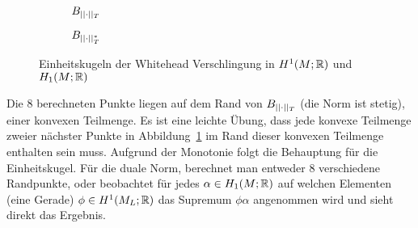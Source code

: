         \begin{figure}[H]
        \centering
        \begin{subfigure}[l]{0.4\textwidth}
                \caption{$B_{||\cdot||_T}$}\label{fig:whiteheadthur}
        
        
        \end{subfigure}    
        \hfill
    \begin{subfigure}[r]{0.4\textwidth}
    \caption{$B_{||\cdot||_T^*}$}

    \end{subfigure}
    \caption{Einheitskugeln der Whitehead Verschlingung in $H^1(M;\mathbb{R})$ und $H_1(M;\mathbb{R})$}
    \end{figure}
    Die $8$ berechneten Punkte liegen auf dem Rand von $B_{||\cdot||_T}$ (die Norm ist stetig), einer konvexen Teilmenge. Es ist eine leichte Übung, dass jede konvexe Teilmenge zweier nächster Punkte in Abbildung~\ref{fig:whiteheadthur} im Rand dieser konvexen Teilmenge enthalten sein muss. Aufgrund der Monotonie folgt die Behauptung für die Einheitskugel. Für die duale Norm, berechnet man entweder $8$ verschiedene Randpunkte, oder beobachtet für jedes $\alpha \in H_1(M;\mathbb{R})$ auf welchen Elementen (eine Gerade) $\phi \in H^1(M_L;\mathbb{R})$ das Supremum $\phi \alpha$ angenommen wird und sieht direkt das Ergebnis.

